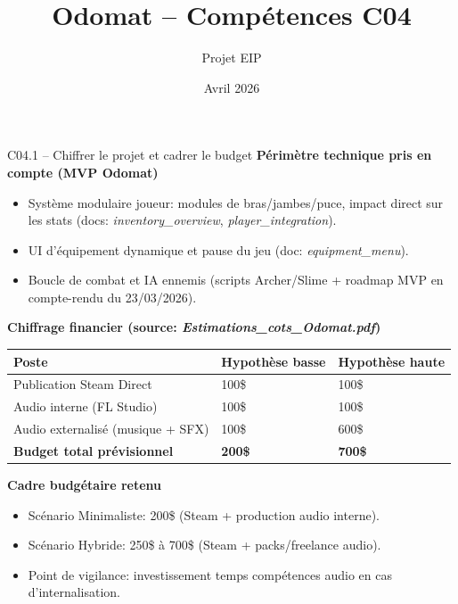 \documentclass[aspectratio=169]{beamer}
\title{Odomat -- Comp\'etences C04}
\author{Projet EIP}
\date{Avril 2026}
\begin{document}
\begin{frame}
\titlepage
\end{frame}

\begin{frame}{C04.1 -- Chiffrer le projet et cadrer le budget}
\textbf{P\'erim\`etre technique pris en compte (MVP Odomat)}
\begin{itemize}
    \item Syst\`eme modulaire joueur: modules de bras/jambes/puce, impact direct sur les stats (docs: \textit{inventory\_overview}, \textit{player\_integration}).
    \item UI d'\'equipement dynamique et pause du jeu (doc: \textit{equipment\_menu}).
    \item Boucle de combat et IA ennemis (scripts Archer/Slime + roadmap MVP en compte-rendu du 23/03/2026).
\end{itemize}

\vspace{0.4em}
\textbf{Chiffrage financier (source: \textit{Estimations\_cots\_Odomat.pdf})}
\begin{table}
\small
\centering
\begin{tabular}{@{}lll@{}}
\toprule
Poste & Hypoth\`ese basse & Hypoth\`ese haute \\
\midrule
Publication Steam Direct & 100\$ & 100\$ \\
Audio interne (FL Studio) & 100\$ & 100\$ \\
Audio externalis\'e (musique + SFX) & 100\$ & 600\$ \\
\midrule
\textbf{Budget total pr\'evisionnel} & \textbf{200\$} & \textbf{700\$} \\
\bottomrule
\end{tabular}
\end{table}

\textbf{Cadre budg\'etaire retenu}
\begin{itemize}
    \item Sc\'enario Minimaliste: 200\$ (Steam + production audio interne).
    \item Sc\'enario Hybride: 250\$ \`a 700\$ (Steam + packs/freelance audio).
    \item Point de vigilance: investissement temps comp\'etences audio en cas d'internalisation.
\end{itemize}
\end{frame}
\end{document}
